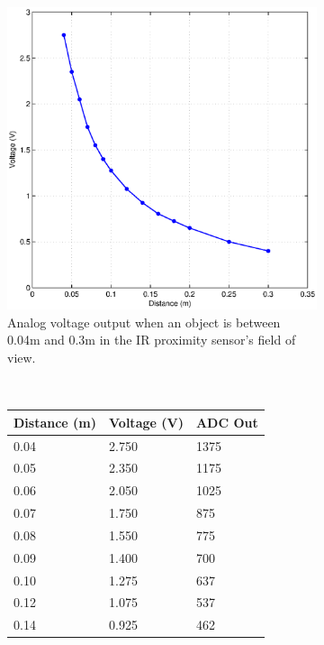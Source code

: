 \documentclass[10pt]{article}
\begin{document}
\begin{figure}[t]
  \centering
  \begin{subfigure}{0.45\textwidth}
    \includegraphics[width=\textwidth]{images/ir-sensor-graph.eps}
    \caption{Analog voltage output when an object is between 0.04m and 0.3m in the IR proximity sensor's field of view.}
    \label{fig:ir-volts-meters}
  \end{subfigure}
  $\qquad$
  \begin{subfigure}{0.45\textwidth}
    \begin{center}
    \begin{tabular}{|p{}|p{}|p{}|}
       \hline
       Distance (m) & Voltage (V) & ADC Out\\
       \hline
       0.04 & 2.750 & 1375 \\
       0.05 & 2.350 & 1175 \\
       0.06 & 2.050 & 1025 \\
       0.07 & 1.750 & 875 \\
       0.08 & 1.550 & 775 \\
       0.09 & 1.400 & 700 \\
       0.10 & 1.275 & 637 \\
       0.12 & 1.075 & 537 \\
       0.14 & 0.925 & 462 \\

\end{tabular}
\end{center}
\end{subfigure}
\end{figure}
\end{document}
